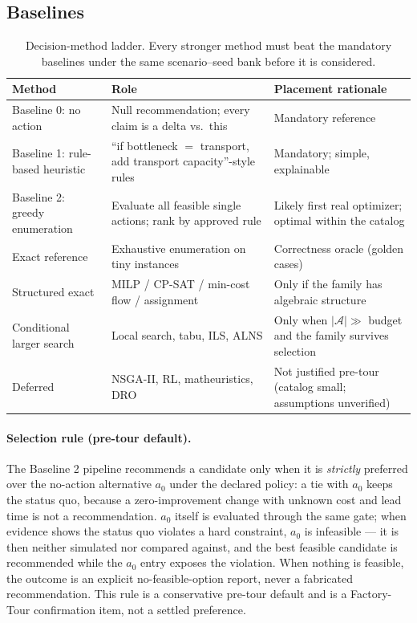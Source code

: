 \documentclass[11pt,a4paper]{article}
\newcommand{\Acal}{\mathcal{A}}
\begin{document}
\subsection{Baselines}\label{sec:baselines}

\begin{table}[htbp]
\centering\small
\caption{Decision-method ladder. Every stronger method must beat the
mandatory baselines under the same scenario--seed bank before it is
considered.}
\label{tab:baselines}
\begin{tabular}{@{}p{4.2cm}p{6.4cm}p{3.8cm}@{}}
\toprule
Method & Role & Placement rationale \\
\midrule
Baseline 0: no action & Null recommendation; every claim is a delta vs.\ this
& Mandatory reference \\
Baseline 1: rule-based heuristic & ``if bottleneck $=$ transport, add
transport capacity''-style rules & Mandatory; simple, explainable \\
Baseline 2: greedy enumeration & Evaluate all feasible single actions; rank
by approved rule & Likely first real optimizer; optimal within the catalog \\
\addlinespace
Exact reference & Exhaustive enumeration on tiny instances & Correctness
oracle (golden cases) \\
Structured exact & MILP / CP-SAT / min-cost flow / assignment & Only if the
family has algebraic structure \\
Conditional larger search & Local search, tabu, ILS, ALNS & Only when
$|\Acal| \gg$ budget and the family survives selection \\
Deferred & NSGA-II, RL, matheuristics, DRO & Not justified pre-tour (catalog
small; assumptions unverified) \\
\bottomrule
\end{tabular}
\end{table}

\paragraph{Selection rule (pre-tour default).} The Baseline 2 pipeline
recommends a candidate only when it is \emph{strictly} preferred over the
no-action alternative $a_0$ under the declared policy: a tie with $a_0$
keeps the status quo, because a zero-improvement change with unknown cost
and lead time is not a recommendation. $a_0$ itself is evaluated through
the same gate; when evidence shows the status quo violates a hard
constraint, $a_0$ is infeasible --- it is then neither simulated nor
compared against, and the best feasible candidate is recommended while the
$a_0$ entry exposes the violation. When nothing is feasible, the outcome
is an explicit no-feasible-option report, never a fabricated
recommendation. This rule is a conservative pre-tour default and is a
Factory-Tour confirmation item, not a settled preference.
\end{document}
